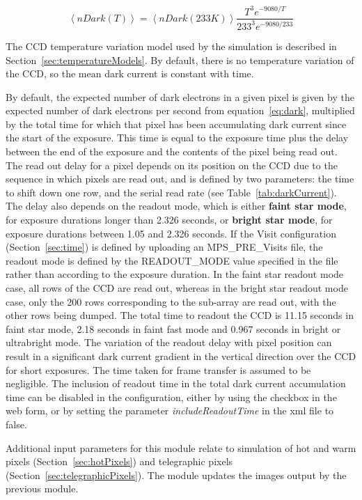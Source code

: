 \documentclass[11pt]{article}      %
\def\HCode#1{}
\def\htmlanchor#1{\HCode{<a id="#1"></a>}}
\begin{document}
\begin{equation}
\left< nDark(T)\right> = \left< nDark(233K)\right>\frac{T^3e^{-9080/T}}{233^3e^{-9080/233}}
\label{eq:dark}
\end{equation}

The CCD temperature variation model used by the simulation is described in Section~\ref{sec:temperatureModels}.  By default, there is no temperature variation of the CCD, so the mean dark current is constant with time.

\htmlanchor{readoutModes}
By default, the expected number of dark electrons in a given pixel is given by the expected number of dark electrons per second from equation~\ref{eq:dark}, multiplied by the total time for which that pixel has been accumulating dark current since the start of the exposure. This time is equal to the exposure time plus the delay between the end of the exposure and the contents of the pixel being read out. The read out delay for a pixel depends on its position on the CCD due to the sequence in which pixels are read out, and is defined by two parameters: the time to shift down one row, and the serial read rate (see Table~\ref{tab:darkCurrent}). The delay also depends on the readout mode, which is either {\bf faint star mode}, for exposure durations longer than 2.326 seconds, or {\bf bright star mode}, for exposure durations between 1.05 and 2.326 seconds. If the Visit configuration (Section~\ref{sec:time}) is defined by uploading an MPS\_PRE\_Visits file, the readout mode is defined by the READOUT\_MODE value specified in the file rather than according to the exposure duration. In the faint star readout mode case, all rows of the CCD are read out, whereas in the bright star readout mode case, only the 200 rows corresponding to the sub-array are read out, with the other rows being dumped. The total time to readout the CCD is 11.15 seconds in faint star mode, 2.18 seconds in faint fast mode and 0.967 seconds in bright or ultrabright mode. The variation of the readout delay with pixel position can result in a significant dark current gradient in the vertical direction over the CCD for short exposures. The time taken for frame transfer is assumed to be negligible. The inclusion of readout time in the total dark current accumulation time can be disabled in the configuration, either by using the checkbox in the web form, or by setting the parameter {\it includeReadoutTime} in the xml file to false.

Additional input parameters for this module relate to simulation of hot and warm pixels (Section~\ref{sec:hotPixels}) and telegraphic pixels (Section~\ref{sec:telegraphicPixels}).  The module updates the images output by the previous module.
\end{document}

